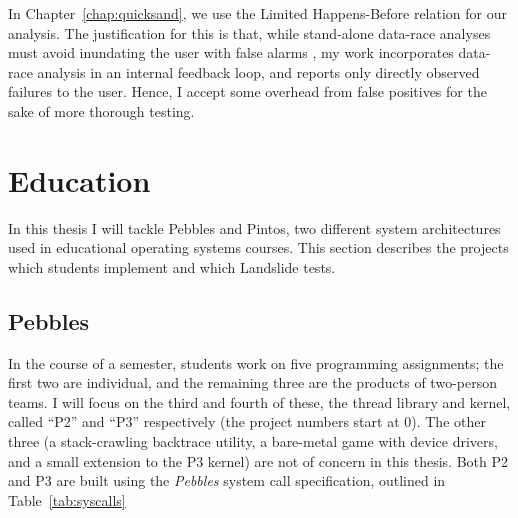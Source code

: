 
In Chapter~\ref{chap:quicksand}, we use the Limited Happens-Before relation for our analysis.
The justification for this is that, while stand-alone data-race analyses must avoid inundating the user with false alarms \cite{racerx},
my work incorporates data-race analysis in an internal feedback loop, and reports only directly observed failures to the user.
Hence, I accept some overhead from false positives for the sake of more thorough testing.


\section{Education}

In this thesis I will tackle Pebbles and Pintos, two different system architectures used in educational operating systems courses.
This section describes the projects which students implement and which Landslide tests.

\subsection{Pebbles}

In the course of a semester, students work on five programming assignments;
the first two are individual, and the remaining three are the products of two-person teams.
I will focus on the third and fourth of these, the thread library and kernel,
called ``P2'' and ``P3'' respectively (the project numbers start at 0).
The other three (a stack-crawling backtrace utility, a bare-metal game with device drivers, and a small extension to the P3 kernel) are not of concern in this thesis.
Both P2 and P3 are built using the {\em Pebbles} system call specification, outlined in Table~\ref{tab:syscalls}

